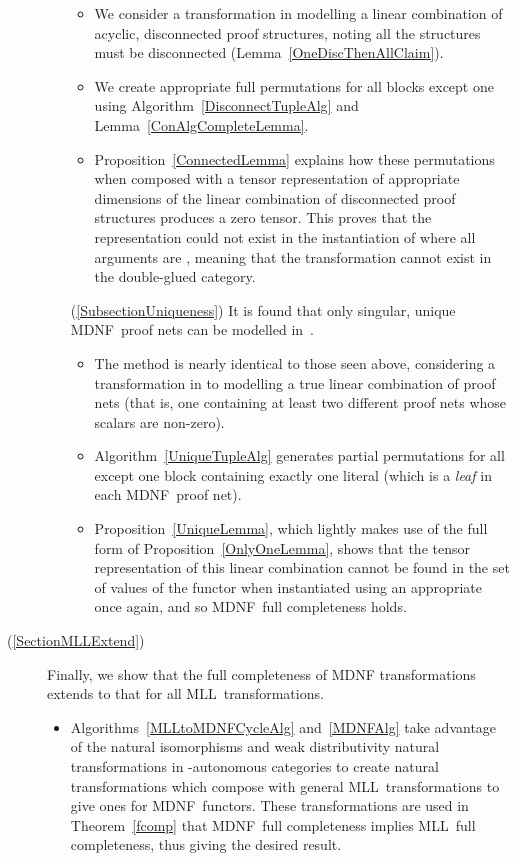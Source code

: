 \documentclass{LMCS}
\theoremstyle{plain}\newtheorem*{cLm}{Claim}
\newcommand{\mll}{MLL} \newcommand{\mall}{MALL}
\begin{document}
\begin{description}
\begin{enumerate}[label=(\autoref{SectionZeroTransProof})]
\begin{itemize}
		\item We consider a transformation  in  modelling a linear combination of acyclic, disconnected proof structures, noting all the structures must be disconnected (Lemma~\ref{OneDiscThenAllClaim}).
		\item We create appropriate full permutations for all blocks except one using Algorithm~\ref{DisconnectTupleAlg} and Lemma~\ref{ConAlgCompleteLemma}.
		\item Proposition~\ref{ConnectedLemma} explains how these permutations when composed with a tensor representation of appropriate dimensions of the linear combination of disconnected proof structures produces a zero tensor. This proves that the representation could not exist in the instantiation of  where all arguments are , meaning that the transformation cannot exist in the double-glued category.
		\end{itemize}
	\item[(\autoref{SubsectionUniqueness})] It is found that only singular, unique MDNF~proof nets can be modelled in~.
		\begin{itemize}
		\item The method is nearly identical to those seen above, considering a transformation in  to  modelling a true linear combination of proof nets (that is, one containing at least two different proof nets whose scalars are non-zero).
		\item Algorithm~\ref{UniqueTupleAlg} generates partial permutations for all except one block containing exactly one literal (which is a \emph{leaf} in each MDNF~proof net).
		\item Proposition~\ref{UniqueLemma}, which lightly makes use of the full form of Proposition~\ref{OnlyOneLemma}, shows that the tensor representation of this linear combination cannot be found in the set of values of the functor when instantiated using an appropriate  once again, and so MDNF~full completeness holds.
		\end{itemize}
	\end{enumerate}
\item[(\autoref{SectionMLLExtend})] Finally, we show that the full completeness of MDNF transformations extends to that for all \mll~transformations.
		\begin{itemize}
		\item Algorithms~\ref{MLLtoMDNFCycleAlg} and~\ref{MDNFAlg} take advantage of the natural isomorphisms and weak distributivity natural transformations in -autonomous categories to create natural transformations which compose with general \mll~transformations to give ones for MDNF~functors. These transformations are used in Theorem~\ref{fcomp} that MDNF~full completeness implies \mll~full completeness, thus giving the desired result.
		\end{itemize}\medskip
\end{description}
\end{document}
